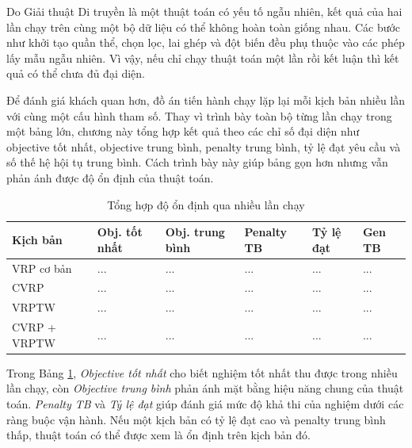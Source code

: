 \documentclass[12pt,a4paper]{article}
\numberwithin{figure}{subsection}
\begin{document}
Do Giải thuật Di truyền là một thuật toán có yếu tố ngẫu nhiên, kết quả của hai lần chạy trên cùng một bộ dữ liệu có thể không hoàn toàn giống nhau. Các bước như khởi tạo quần thể, chọn lọc, lai ghép và đột biến đều phụ thuộc vào các phép lấy mẫu ngẫu nhiên. Vì vậy, nếu chỉ chạy thuật toán một lần rồi kết luận thì kết quả có thể chưa đủ đại diện.

Để đánh giá khách quan hơn, đồ án tiến hành chạy lặp lại mỗi kịch bản nhiều lần với cùng một cấu hình tham số. Thay vì trình bày toàn bộ từng lần chạy trong một bảng lớn, chương này tổng hợp kết quả theo các chỉ số đại diện như objective tốt nhất, objective trung bình, penalty trung bình, tỷ lệ đạt yêu cầu và số thế hệ hội tụ trung bình. Cách trình bày này giúp bảng gọn hơn nhưng vẫn phản ánh được độ ổn định của thuật toán.

\begin{table}[H]
    \centering
    \caption{Tổng hợp độ ổn định qua nhiều lần chạy}
    \label{tab:stability_summary}
    \renewcommand{\arraystretch}{1.35}
    \small
    \begin{tabularx}{\textwidth}{|
        >{\raggedright\arraybackslash}p{2.8cm}|
        >{\centering\arraybackslash}X|
        >{\centering\arraybackslash}X|
        >{\centering\arraybackslash}X|
        >{\centering\arraybackslash}p{1.7cm}|
        >{\centering\arraybackslash}p{1.7cm}|}
        \hline
        \textbf{Kịch bản} &
        \textbf{Obj. tốt nhất} &
        \textbf{Obj. trung bình} &
        \textbf{Penalty TB} &
        \textbf{Tỷ lệ đạt} &
        \textbf{Gen TB} \\
        \hline
        VRP cơ bản & ... & ... & ... & ... & ... \\
        \hline
        CVRP & ... & ... & ... & ... & ... \\
        \hline
        VRPTW & ... & ... & ... & ... & ... \\
        \hline
        CVRP + VRPTW & ... & ... & ... & ... & ... \\
        \hline
    \end{tabularx}
\end{table}

Trong Bảng \ref{tab:stability_summary}, \textit{Objective tốt nhất} cho biết nghiệm tốt nhất thu được trong nhiều lần chạy, còn \textit{Objective trung bình} phản ánh mặt bằng hiệu năng chung của thuật toán. \textit{Penalty TB} và \textit{Tỷ lệ đạt} giúp đánh giá mức độ khả thi của nghiệm dưới các ràng buộc vận hành. Nếu một kịch bản có tỷ lệ đạt cao và penalty trung bình thấp, thuật toán có thể được xem là ổn định trên kịch bản đó.
\end{document}
